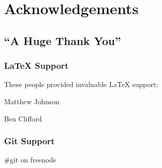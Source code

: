 \chapter{Acknowledgements}
\section{``A Huge Thank You''}

\subsection{\LaTeX{} Support}
These people provided invaluable \LaTeX{} support:

Matthew Johnson

Ben Clifford

\subsection{Git Support}
\#git on freenode
